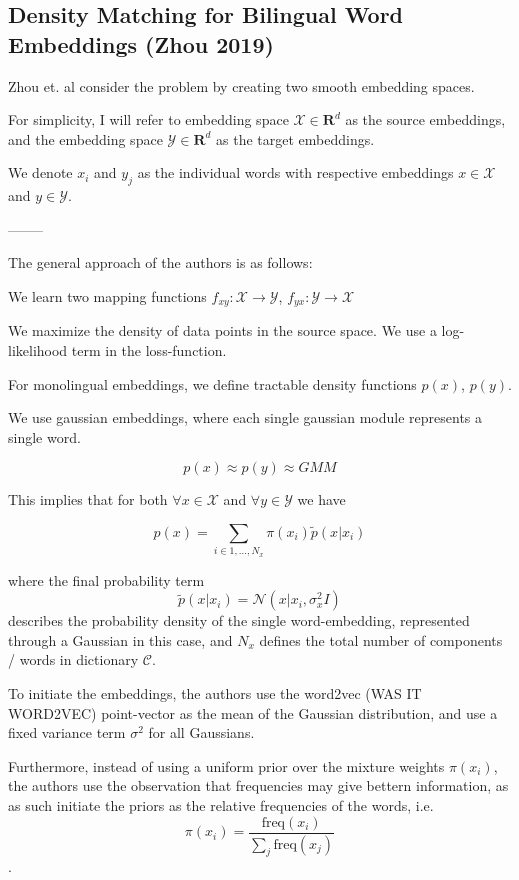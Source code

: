 \documentclass[a4paper,12pt,twoside,openright]{report}
\begin{document}
\subsection{Density Matching for Bilingual Word Embeddings (Zhou 2019)}

Zhou et. al consider the problem by creating two smooth embedding spaces.

For simplicity, I will refer to embedding space $\mathcal{X} \in \mathbf{R}^d$ as the source embeddings, and the embedding space $\mathcal{Y} \in \mathbf{R}^d$ as the target embeddings. 

We denote $ x_i $ and $y_j$ as the individual words with respective embeddings $x \in \mathcal{X}$ and $y \in \mathcal{Y}$.

--------

The general approach of the authors is as follows:

We learn two mapping functions $f_{xy} : \mathcal{X} \rightarrow \mathcal{Y}$, $f_{yx} : \mathcal{Y} \rightarrow \mathcal{X}$

We maximize the density of data points in the source space. 
We use a log-likelihood term in the loss-function.

For monolingual embeddings, we define tractable density functions $p(x)$, $p(y)$.

We use gaussian embeddings, where each single gaussian module represents a single word.

\begin{equation}
p(x) \approx p(y) \approx GMM
\end{equation}

This implies that for both $\forall x \in \mathcal{X}$ and $\forall y \in \mathcal{Y}$ we have

\begin{equation}
p(x) = \sum_{i \in {1, \ldots, N_x} } \pi(x_i) \tilde{p}(x|x_i)
\end{equation}

where the final probability term $$\tilde{p}(x|x_i) = \mathcal{N}(x | x_i, \sigma^2_x I) $$ describes the probability density of the single word-embedding, represented through a Gaussian in this case, and $N_x$ defines the total number of components / words in dictionary $\mathcal{C}$.

To initiate the embeddings, the authors use the word2vec (WAS IT WORD2VEC) point-vector as the mean of the Gaussian distribution, and use a fixed variance term $\sigma^2$ for all Gaussians.

Furthermore, instead of using a uniform prior over the mixture weights $\pi(x_i)$, the authors use the observation that frequencies may give bettern information, as as such initiate the priors as the relative frequencies of the words, i.e. $$ \pi(x_i) = \frac{ \text{freq} (x_i) }{\sum_j \text{freq} (x_j) } $$ .
\end{document}
